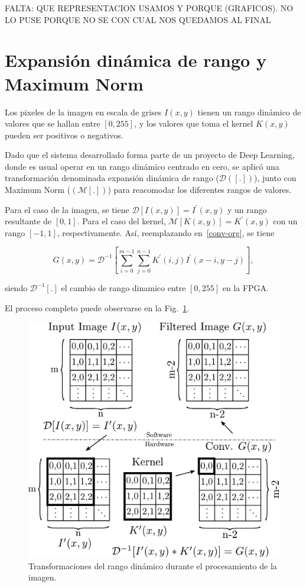 FALTA: QUE REPRESENTACION USAMOS Y  PORQUE (GRAFICOS). NO LO PUSE PORQUE NO SE CON CUAL NOS QUEDAMOS AL FINAL

\section{Expansión dinámica de rango y Maximum Norm}\label{dynamicrange}
Los pixeles de la imagen en escala de grises $I(x,y)$ tienen un rango dinámico de valores que se hallan entre $[0,255]$,
y los valores que toma el kernel $K(x,y)$ pueden ser positivos o negativos.

Dado que el sistema desarrollado forma parte de un proyecto de Deep Learning,
donde es usual operar en un rango dinámico centrado en cero, se aplicó una
transformación denominada  expansión dinámica de rango ($\mathcal{D}([.])$),
junto con Maximum Norm ($(\mathcal{M}[.])$) para reacomodar los diferentes 
rangos de valores. 

Para el caso de la imagen, se tiene $\mathcal{D}[I(x,y)]=I^\prime(x,y)$ y un rango resultante de $[0,1]$.
Para el caso del kernel, $\mathcal{M}[K(x,y)]=K^\prime(x,y)$ con un rango $[-1,1]$, respectivamente.
Así, reemplazando en~\ref{conv-org}, se tiene 

\begin{equation}\label{conv-org1}
  G(x,y) = \mathcal{D}^{-1}\left[\sum_{i=0}^{m-1} \sum_{j=0}^{n-1}K^\prime(i,j)I^\prime(x-i,y-j)\right],
\end{equation}

siendo $\mathcal{D}^{-1}[.]$ el cambio de rango dinamico entre $[0,255]$ en la FPGA.

El proceso completo puede observarse en la Fig.~\ref{transformation}.

\begin{figure}
\centering
\includegraphics[scale=0.47]{wflow3}
\caption{Transformaciones del rango dinámico durante el procesamiento de la imagen.}
\label{transformation}
\end{figure}

